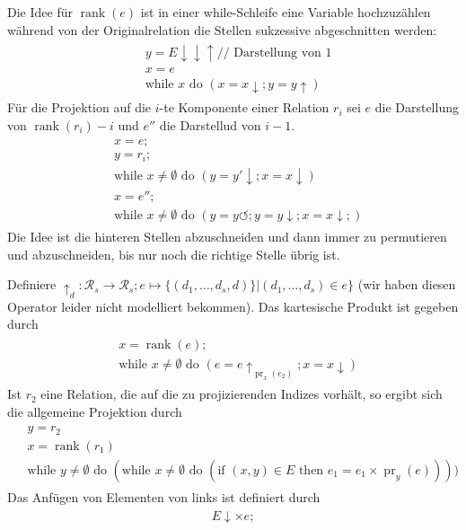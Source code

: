 \documentclass[12pt,a4paper]{amsart}
\DeclareMathOperator{\rank}{rank}
\DeclareMathOperator{\pr}{pr}
\begin{document}
\begin{aufgabe1}
Die Idee für $\rank(e)$ ist in einer while-Schleife eine Variable hochzuzählen während von der Originalrelation die Stellen sukzessive abgeschnitten werden:
\begin{align*}
\begin{split}
&y=E\downarrow\downarrow\uparrow \mbox{// Darstellung von 1}\\
&x=e\\
&\mbox{while }x\mbox{ do }(x=x\downarrow;y=y\uparrow)
\end{split}
\end{align*}
Für die Projektion auf die $i$-te Komponente einer Relation $r_i$ sei $e$ die Darstellung von $\rank(r_i)-i$ und $e''$ die Darstellud von $i-1$. 
\begin{align*}
\begin{split}
&x=e; \\
&y=r_i; \\
&\mbox{while }x\neq\emptyset\mbox{ do }(y=y'\downarrow;x=x\downarrow)\\
&x=e'';\\
&\mbox{while }x\neq\emptyset\mbox{ do }(y=y\circlearrowleft;y=y\downarrow;x=x\downarrow;)
\end{split}
\end{align*}
Die Idee ist die hinteren Stellen abzuschneiden und dann immer zu permutieren und abzuschneiden, bis nur noch die richtige Stelle übrig ist.

\medskip

Definiere $\uparrow_d:\mathcal{R}_s\rightarrow\mathcal{R}_s;e\mapsto\{(d_1,\dots,d_s,d)\}|(d_1,\dots,d_s)\in e\}$ (wir haben diesen Operator leider nicht modelliert bekommen).
Das kartesische Produkt ist gegeben durch
\begin{align*}
\begin{split}
&x=\rank(e);\\
&\mbox{while }x\neq\emptyset\mbox{ do }(e=e\uparrow_{\pr_x(e_2)};x=x\downarrow)
\end{split}
\end{align*}
 Ist $r_2$ eine Relation, die auf die zu projizierenden Indizes vorhält, so ergibt sich die allgemeine Projektion durch
 \begin{align*}
 \begin{split}
 &y=r_2\\
 &x=\rank(r_1)\\
 &\mbox{while }y\neq\emptyset\mbox{ do }(\mbox{while }x\neq\emptyset\mbox{ do }(\mbox{if }(x,y)\in E \mbox{ then }e_1=e_1\times \pr_y(e))))
 \end{split}
 \end{align*}
Das Anfügen von Elementen von links ist definiert durch
\begin{align*}
\begin{split}
E\downarrow\times e;
\end{split}
\end{align*}
\end{aufgabe1}
\end{document}
